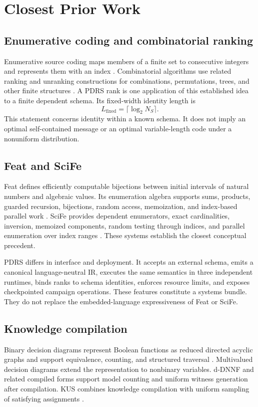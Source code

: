 \section{Closest Prior Work}\label{sec:prior}
\subsection{Enumerative coding and combinatorial ranking}
Enumerative source coding maps members of a finite set to consecutive integers and represents them with an index \cite{cover1973}. Combinatorial algorithms use related ranking and unranking constructions for combinations, permutations, trees, and other finite structures \cite{nijenhuis1978}. A PDRS rank is one application of this established idea to a finite dependent schema. Its fixed-width identity length is
\begin{equation}
  L_{\mathrm{fixed}}=\lceil\log_2 N_S\rceil.
\end{equation}
This statement concerns identity within a known schema. It does not imply an optimal self-contained message or an optimal variable-length code under a nonuniform distribution.

\subsection{Feat and SciFe}
Feat defines efficiently computable bijections between initial intervals of natural numbers and algebraic values. Its enumeration algebra supports sums, products, guarded recursion, bijections, random access, memoization, and index-based parallel work \cite{feat2012}. SciFe provides dependent enumerators, exact cardinalities, inversion, memoized components, random testing through indices, and parallel enumeration over index ranges \cite{scife2015}. These systems establish the closest conceptual precedent.

PDRS differs in interface and deployment. It accepts an external schema, emits a canonical language-neutral IR, executes the same semantics in three independent runtimes, binds ranks to schema identities, enforces resource limits, and exposes checkpointed campaign operations. These features constitute a systems bundle. They do not replace the embedded-language expressiveness of Feat or SciFe.

\subsection{Knowledge compilation}
Binary decision diagrams represent Boolean functions as reduced directed acyclic graphs and support equivalence, counting, and structured traversal \cite{bryant1986bdd}. Multivalued decision diagrams extend the representation to nonbinary variables. d-DNNF and related compiled forms support model counting and uniform witness generation after compilation. KUS combines knowledge compilation with uniform sampling of satisfying assignments \cite{kus2018}.

